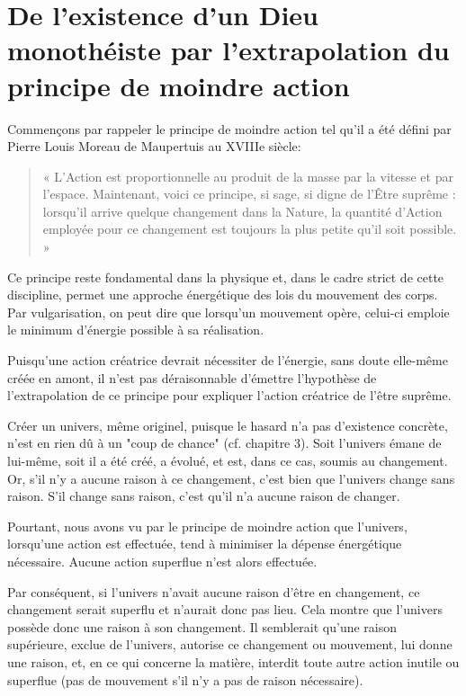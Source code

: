 \chapter{De l'existence d'un Dieu monothéiste par l'extrapolation du principe de moindre action}

Commençons par rappeler le principe de moindre action tel qu'il a été défini par Pierre Louis Moreau de Maupertuis au XVIIIe siècle:

\begin{center}
\begin{quote}

« L'Action est proportionnelle au produit de la masse par la vitesse et par l'espace. Maintenant, voici ce principe, si sage, si digne de l'Être suprême : lorsqu'il arrive quelque changement dans la Nature, la quantité d'Action employée pour ce changement est toujours la plus petite qu'il soit possible. »

\end{quote}
\end{center}

Ce principe reste fondamental dans la physique et, dans le cadre strict de cette discipline, permet une approche énergétique des lois du mouvement des corps. Par vulgarisation, on peut dire que lorsqu'un mouvement opère, celui-ci emploie le minimum d'énergie possible à sa réalisation.

Puisqu'une action créatrice devrait nécessiter de l'énergie, sans doute elle-même créée en amont, il n'est pas déraisonnable d'émettre l'hypothèse de l'extrapolation de ce principe pour expliquer l'action créatrice de l'être suprême.

Créer un univers, même originel, puisque le hasard n'a pas d'existence concrète, n'est en rien dû à un "coup de chance" (cf. chapitre 3). Soit l'univers émane de lui-même, soit il a été créé, a évolué, et est, dans ce cas, soumis au changement. Or, s'il n'y a aucune raison à ce changement, c'est bien que l'univers change sans raison. S'il change sans raison, c'est qu'il n'a aucune raison de changer.

Pourtant, nous avons vu par le principe de moindre action que l'univers, lorsqu'une action est effectuée, tend à minimiser la dépense énergétique nécessaire. Aucune action superflue n'est alors effectuée.

Par conséquent, si l'univers n'avait aucune raison d'être en changement, ce changement serait superflu et n'aurait donc pas lieu. Cela montre que l'univers possède donc une raison à son changement. Il semblerait qu'une raison supérieure, exclue de l'univers, autorise ce changement ou mouvement, lui donne une raison, et, en ce qui concerne la matière, interdit toute autre action inutile ou superflue (pas de mouvement s'il n'y a pas de raison nécessaire).

